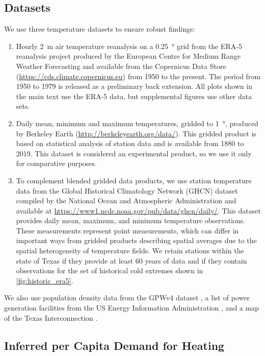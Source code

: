 \documentclass[12pt]{iopart}
\begin{document}
\subsection{Datasets}

We use three temperature datasets to ensure robust findings:
\begin{enumerate}
  \item Hourly \SI{2}{\meter} air temperature reanalysis on a \SI{0.25}{\degree} grid from the ERA-5 reanalysis project produced by the European Centre for Medium Range Weather Forecasting \cite{hersbach_era5:2020} and available  from the Copernicus Data Store (\url{https://cds.climate.copernicus.eu}) from 1950 to the present.
        The period from 1950 to 1979 is released as a preliminary back extension.
        All plots shown in the main text use the ERA-5 data, but supplemental figures use other data sets.
  \item Daily mean, minimum and maximum temperatures, gridded to \SI{1}{\degree}, produced by Berkeley Earth (\url{http://berkeleyearth.org/data/}).
        This gridded product is based on statistical analysis of station data and is available from 1880 to 2019.
        This dataset is considered an experimental product, so we use it only for comparative purposes.
  \item To complement blended gridded data products, we use station temperature data from the Global Historical Climatology Network (GHCN) dataset compiled by the National Ocean and Atmospheric Administration \cite{Menne:2012hk} and available at \url{https://www1.ncdc.noaa.gov/pub/data/ghcn/daily/}.
        This dataset provides daily mean, maximum, and minimum temperature observations.
        These measurements represent point measurements, which can differ in important ways from gridded products describing spatial averages due to the spatial heterogeneity of temperature fields.
        We retain stations within the state of Texas if they provide at least 60 years of data and if they contain observations for the set of historical cold extremes shown in \cref{fig:historic_era5}.
\end{enumerate}
We also use population density data from the GPWv4 dataset \cite{ciesin_gpwv4:2016}, a list of power generation facilities from the US Energy Information Administration \cite{useia_generators:2021}, and a map of the Texas Interconnection \cite{useia_regions:2021}.%


\subsection{Inferred per Capita Demand for Heating}\label{sec:inferred-demand}
\end{document}
